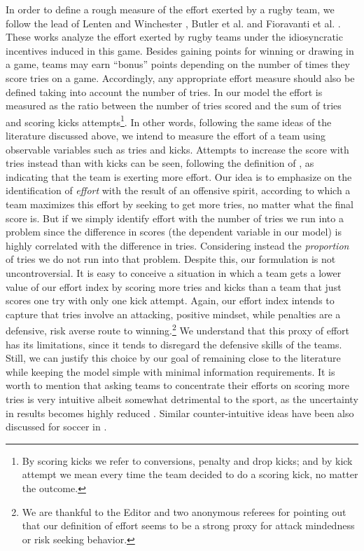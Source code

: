 \documentclass[]{article}
\begin{document}
In order to define a rough measure of the effort exerted by a rugby team, we follow the lead of Lenten and Winchester \cite{lenten2015secondary}, Butler et al. \cite{butler2020bonus} and Fioravanti et al. \cite{fioravanti2021effort}. These works analyze the effort exerted by rugby teams under the idiosyncratic incentives induced in this game. Besides gaining points for winning or drawing in a game, teams may earn ``bonus'' points depending on the number of times they score tries on a game. Accordingly, any appropriate effort measure should also be defined taking into account the number of tries. In our model the effort is measured as the ratio between the number of tries scored and the sum of tries and scoring kicks attempts\footnote{By scoring kicks we refer to conversions, penalty and drop kicks; and by kick attempt we mean every time the team decided to do a scoring kick, no matter the outcome.}. In other words, following the same ideas of the literature discussed above, we intend to measure the effort of a team using observable variables such as tries and kicks. Attempts to increase the score with tries instead than with kicks can be seen, following the definition of \cite{massin2017towards}, as indicating that the team is exerting more effort. Our idea is to emphasize on the identification of {\em effort} with the result of an offensive spirit, according to which a team maximizes this effort by seeking to get more tries, no matter what the final score is. But if we simply identify effort with the number of tries we run into a problem since the difference in scores (the dependent variable in our model) is highly correlated with the difference in tries. Considering instead the {\em proportion} of tries we do not run into that problem. Despite this, our formulation is not uncontroversial. It is easy to conceive a situation in which a team gets a lower value of our effort index by scoring more tries and kicks than a team that just scores one try with only one kick attempt. Again, our effort index intends to capture that tries involve an attacking, positive mindset, while penalties are a defensive, risk averse route to winning.\footnote{We are thankful to the Editor and two anonymous referees for pointing out that our definition of effort seems to be a strong proxy for  attack mindedness or risk seeking behavior.} We understand that this proxy of effort has its limitations, since it tends to disregard the defensive skills of the teams. Still, we can justify this choice by our goal of remaining close to the literature while keeping the model simple with minimal information requirements. It is worth to mention that asking teams to concentrate their efforts on scoring more tries is very intuitive albeit somewhat detrimental to the sport, as the uncertainty in results becomes highly reduced \cite{scarf2019outcome}. Similar counter-intuitive ideas have been also discussed for soccer in \cite{fry2021managing}. \\
\end{document}
